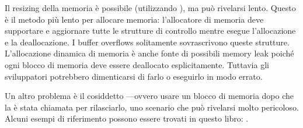 \begin{itemize}
Il resizing della memoria è possibile (utilizzando ), ma può rivelarsi lento.
Questo è il metodo più lento per allocare memoria: l'allocatore di memoria deve supportare e aggiornare tutte le strutture di controllo mentre esegue l'allocazione e la deallocazione.
I buffer overflows solitamente sovrascrivono queste strutture.
L'allocazione dinamica di memoria è anche fonte di possibili memory leak poiché ogni blocco di memoria deve essere deallocato esplicitamente. Tuttavia gli sviluppatori potrebbero dimenticarsi di farlo o eseguirlo in modo errato.

Un altro problema è il cosiddetto ---ovvero usare un blocco di memoria dopo che la  è stata chiamata per rilasciarlo, uno scenario che può rivelarsi molto pericoloso.
Alcuni esempi di riferimento possono essere trovati in questo libro: .

\end{itemize}
